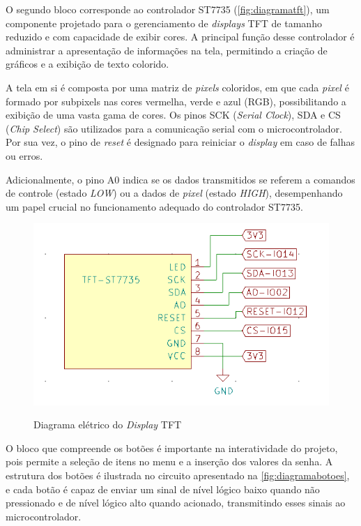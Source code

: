 O segundo bloco corresponde ao controlador ST7735 (\autoref{fig:diagramatft}), 
um componente projetado para o gerenciamento de \textit{displays} TFT de tamanho 
reduzido e com capacidade de exibir cores. A principal função desse 
controlador é administrar a apresentação de informações na tela, 
permitindo a criação de gráficos e a exibição de texto colorido.

A tela em si é composta por uma matriz de \textit{pixels} coloridos, em que 
cada \textit{pixel} é formado por subpixels nas cores vermelha, verde e azul 
(RGB), possibilitando a exibição de uma vasta gama de cores. Os pinos 
SCK (\textit{Serial Clock}), SDA e CS (\textit{Chip Select}) são utilizados para a 
comunicação serial com o microcontrolador. Por sua vez, o pino de 
\textit{reset} é designado para reiniciar o \textit{display} em caso de falhas ou erros.

Adicionalmente, o pino A0 indica 
se os dados transmitidos se referem a comandos de controle (estado \textit{LOW}) 
ou a dados de \textit{pixel} (estado \textit{HIGH}), desempenhando um papel crucial no 
funcionamento adequado do controlador ST7735.

\begin{figure}[h!]
    \centering
    \caption{Diagrama elétrico do \textit{Display} TFT}
    \includegraphics[scale=0.36]{figuras/modulo_tft.png}
    \fonte{}%
    \label{fig:diagramatft}
    \centering
\end{figure}

O bloco que compreende os botões é importante na 
interatividade do projeto, pois permite a seleção de itens no menu 
e a inserção dos valores da senha. A estrutura dos botões é 
ilustrada no circuito apresentado na \autoref{fig:diagramabotoes}, e 
cada botão é capaz de enviar um sinal de nível lógico baixo quando não 
pressionado e de nível lógico alto quando acionado, transmitindo esses 
sinais ao microcontrolador.

